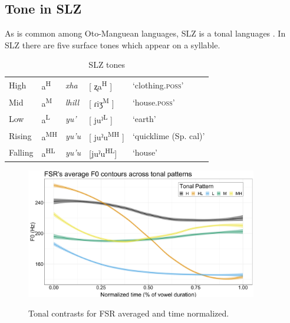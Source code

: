 \documentclass[12pt, letterpaper]{article}
\newcommand{\supr}[1]{\textsuperscript{#1}}
\providecommand{\lsptoprule}{\midrule\toprule}
\providecommand{\lspbottomrule}{\bottomrule\midrule}
\begin{document}
\subsection{Tone in SLZ} \label{sec:Tone}

As is common among Oto-Manguean languages, SLZ is a tonal languages \citep{suarezMesoamericanIndianLanguages1983,campbellMesoAmericaLinguisticArea1986,silvermanLaryngealComplexityOtomanguean1997,campbellOtomangueanHistoricalLinguistics2017a,campbellOtomangueanHistoricalLinguistics2017}. In SLZ there are five surface tones which appear on a syllable. 


\begin{table}[!h]
	\centering
	\caption{SLZ tones}
	\label{tab:tones}
	 \begin{tabular}{lllll}
	  \lsptoprule
	  High   	&  a\supr{H}  &  \textit{xha}   &  [ ʐa\supr{H} ] & `clothing.\textsc{poss}'\\
		Mid    	&  a\supr{M}  &  \textit{lhill} 	& [ ɾiʒ\supr{M} ] & `house.\textsc{poss}' \\
		Low   	&  a\supr{L}  &  \textit{yu'} 	&	 [ juˀ\supr{L} ] & `earth'\\
		Rising	&  a\supr{MH}  &  \textit{yu'u} 	&	[ juˀu\supr{MH} ] & `quicklime (Sp. cal)' \\
		Falling &  a\supr{HL}  &  \textit{yu'u}  &	[juˀu\supr{HL}] &	`house' \\
	  \lspbottomrule
	 \end{tabular}
\end{table}

\begin{figure}[!ht]
	\centering
	\includegraphics[width=0.9\textwidth]{../FSRTonePlot.png}
	\label{fig:FSRTonePlot}
	\caption{Tonal contrasts for FSR averaged and time normalized.}
\end{figure}
\end{document}
